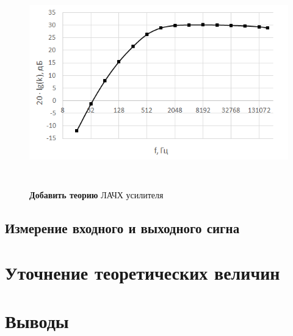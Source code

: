 \begin{figure}[H]
	\begin{center}
		\includegraphics[height=9cm]{img/2}
		\caption{\textbf{Добавить теорию} ЛАЧХ усилителя}
		\label{figure:2}
	\end{center}
\end{figure}

\subsection{Измерение входного и выходного сигна}

\section{Уточнение теоретических величин}

\section{Выводы}



